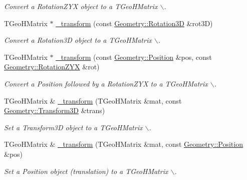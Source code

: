 \begin{DoxyCompactItemize}
\begin{DoxyCompactList}\small\item\em Convert a RotationZYX object to a TGeoHMatrix $\backslash$. \item\end{DoxyCompactList}\item 
TGeoHMatrix $\ast$ \hyperlink{group___d_d4_h_e_p___g_e_o_m_e_t_r_y_ga2b988c5fb8e427e757080009b3a4856f}{\_\-transform} (const \hyperlink{namespace_d_d4hep_1_1_geometry_a022fecb763315fa2bf39cbb648944a0e}{Geometry::Rotation3D} \&rot3D)
\begin{DoxyCompactList}\small\item\em Convert a Rotation3D object to a TGeoHMatrix $\backslash$. \item\end{DoxyCompactList}\item 
TGeoHMatrix $\ast$ \hyperlink{group___d_d4_h_e_p___g_e_o_m_e_t_r_y_gad6f7e93a5f8c5ae037658aa594d2f83b}{\_\-transform} (const \hyperlink{namespace_d_d4hep_1_1_geometry_a55083902099d03506c6db01b80404900}{Geometry::Position} \&pos, const \hyperlink{namespace_d_d4hep_1_1_geometry_a24667b2b9c3cec3d5239828db4d52189}{Geometry::RotationZYX} \&rot)
\begin{DoxyCompactList}\small\item\em Convert a Position followed by a RotationZYX to a TGeoHMatrix $\backslash$. \item\end{DoxyCompactList}\item 
TGeoHMatrix \& \hyperlink{group___d_d4_h_e_p___g_e_o_m_e_t_r_y_gae56d3e609e5195af8ba7271391b608e5}{\_\-transform} (TGeoHMatrix \&mat, const \hyperlink{namespace_d_d4hep_1_1_geometry_aeb4c0356d12fd7be49a0aae50514e64b}{Geometry::Transform3D} \&trans)
\begin{DoxyCompactList}\small\item\em Set a Transform3D object to a TGeoHMatrix $\backslash$. \item\end{DoxyCompactList}\item 
TGeoHMatrix \& \hyperlink{group___d_d4_h_e_p___g_e_o_m_e_t_r_y_ga115e4b33b3d4b31fc0c2a2de57c8a14b}{\_\-transform} (TGeoHMatrix \&mat, const \hyperlink{namespace_d_d4hep_1_1_geometry_a55083902099d03506c6db01b80404900}{Geometry::Position} \&pos)
\begin{DoxyCompactList}\small\item\em Set a Position object (translation) to a TGeoHMatrix $\backslash$. \item\end{DoxyCompactList}\item 

\end{DoxyCompactItemize}
